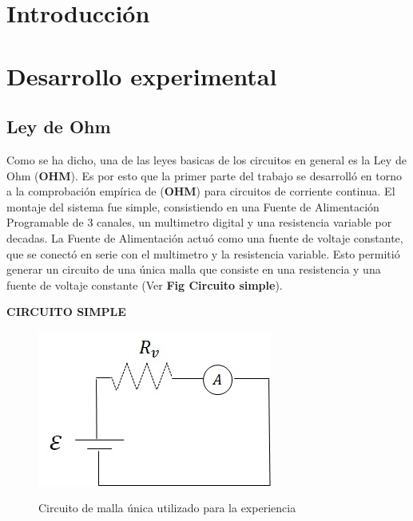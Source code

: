 \documentclass[11pt,a4paper]{article}
\begin{document}
\section{Introducción}\label{sec:intro}
	


\section{Desarrollo experimental}

\subsection{Ley de Ohm}

Como se ha dicho, una de las leyes basicas de los circuitos en general es la Ley de Ohm (\textbf{OHM}). Es por esto que la primer parte del trabajo se desarrolló en torno a la comprobación empírica de (\textbf{OHM}) para circuitos de corriente continua. El montaje del sistema fue simple, consistiendo en una Fuente de Alimentación Programable de 3 canales, un multimetro digital y una resistencia variable por decadas. La Fuente de Alimentación actuó como una fuente de voltaje constante, que se conectó en serie con el multimetro y la resistencia variable. Esto permitió generar un circuito de una única malla que consiste en una resistencia y una fuente de voltaje constante (Ver \textbf{Fig Circuito simple}). 

\textbf{CIRCUITO SIMPLE}

\begin{figure}[h]
  \centering
  \includegraphics[scale=1]{Circuito_simple}
  \label{fig:circ_simp}
  \caption{Circuito de malla única utilizado para la experiencia}
\end{figure}
\end{document}
